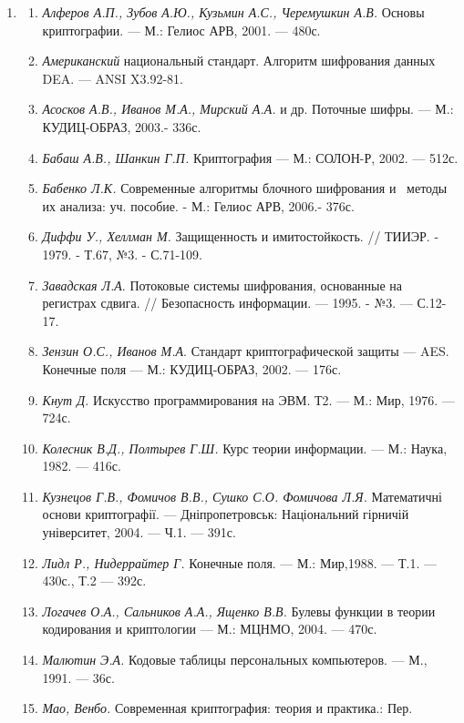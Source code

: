 {{{\liststyleWWviiiNumli
\begin{enumerate}
\item \begin{enumerate}
\item \textit{Алфе}\textit{ров А.П., Зубов А.Ю., Кузьмин А.С., Черемушкин А.В.
}Основы криптографии. --- М.: Гелиос АРВ,  2001. --- 480с.
\item \textit{Американский} национальный стандарт. Алгоритм шифрования данных 
DEA. --- ANSI X3.92-81. 
\item \textit{Асосков А.В., Иванов М.А., Мирский А.А.} и др. Поточные шифры. ---
М.: КУДИЦ-ОБРАЗ, 2003.- 336с.
\item \textit{Бабаш А.В., Шанкин Г.П.} Криптография --- М.: СОЛОН-Р, 2002. --- 512с.
\item {\color[rgb]{0.2,0.2,0.2}
 \textit{Бабенко Л.К.} Современные алгоритмы блочного шифрования и~ методы их
анализа: уч. пособие. - М.: Гелиос АРВ, 2006.- 376с.}
\item {\color[rgb]{0.2,0.2,0.2}
 \textit{Диффи У., Хеллман М.} Защищенность и имитостойкость. // ТИИЭР. - 1979.
- Т.67, №3. - С.71-109.}
\item \textit{Завадская Л.А}. Потоковые системы шифрования, основанные на
регистрах сдвига. // Безопасность информации. --- 1995. - №3. --- С.12-17.
\item \textit{Зензин О.С., Иванов М.А}. Стандарт криптографической защиты --- AES.
 Конечные поля --- М.: КУДИЦ-ОБРАЗ, 2002. ---  176с.
\item \textit{Кнут Д.} Искусство программирования на ЭВМ. Т2. --- М.: Мир, 1976. ---
724с.
\item \textit{Колесник В.Д., Полтырев Г.Ш.} Курс теории информации. --- М.: Наука,
1982. --- 416с. 
\item \textit{Кузнецов Г.В., Фомич}\textit{о}\textit{в В.В., Сушко С.О. Фомичова
Л.Я. }Математичні основи криптографії. --- Дніпропетровськ: Національний гірничій
університет, 2004. --- Ч.1. --- 391с.
\item \textit{Лидл Р., Нидеррайтер Г.} Конечные поля. --- М.: Мир,1988.
---  Т.1. --- 430с., Т.2 --- 392с.
\item \textit{Логачев О.А., Сальников А.А., Ященко В.В.} Булевы
функции в теории кодирования и криптологии --- М.: МЦНМО, 2004. --- 470с.
\item \textit{Малютин Э.А.} Кодовые таблицы персональных компьютеров.
--- М., 1991. --- 36с.
\item \textit{ Мао, Венбо. }Современная  криптография: теория и практика.: Пер.

\end{enumerate}
\end{enumerate}}}}
